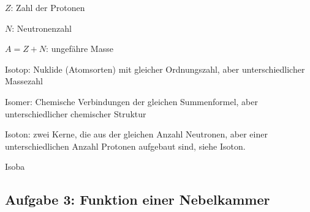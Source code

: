 \startitemize[packed]
\item $Z$: Zahl der Protonen
\item $N$: Neutronenzahl
\item $A = Z + N$: ungefähre Masse 
\stopitemize

\startitemize[packed]
\item Isotop: Nuklide (Atomsorten) mit gleicher Ordnungszahl, aber unterschiedlicher Massezahl
\item Isomer: Chemische Verbindungen der gleichen Summenformel, aber unterschiedlicher chemischer Struktur
\item Isoton: zwei Kerne, die aus der gleichen Anzahl Neutronen, aber einer unterschiedlichen Anzahl Protonen aufgebaut sind, siehe Isoton.
\item Isoba
\stopitemize

\subsection{Aufgabe 3: Funktion einer Nebelkammer}
